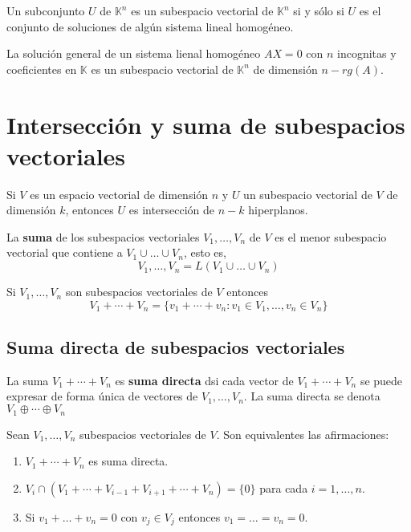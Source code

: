 \begin{theorem}
	Un subconjunto $U$ de $\mathbb{K}^n$ es un subespacio vectorial de $\mathbb{K}^n$ si y sólo si $U$ es el conjunto de soluciones de algún sistema lineal homogéneo.
\end{theorem}

\begin{theorem}
	La solución general de un sistema lienal homogéneo $AX=0$ con $n$ incognitas y coeficientes en $\mathbb{K}$ es un subespacio vectorial de $\mathbb{K}^n$ de dimensión $n-rg(A)$.
\end{theorem}

\section{Intersección y suma de subespacios vectoriales}

\begin{prop}
	Si $V$ es un espacio vectorial de dimensión $n$ y $U$ un subespacio vectorial de $V$ de dimensión $k$, entonces $U$ es intersección de $n-k$ hiperplanos.
\end{prop}

\begin{defi}
	La \textbf{suma} de los subespacios vectoriales $V_1,\ldots,V_n$ de $V$ es el menor subespacio vectorial que contiene a $V_1 \cup \ldots \cup V_n$, esto es,
	\[
	V_1,\ldots,V_n = L(V_1 \cup \ldots \cup V_n)
	\]
\end{defi}

\begin{prop}
	Si $V_1,\ldots,V_n$ son subespacios vectoriales de $V$ entonces
	\[
	V_1 + \cdots + V_n = \lbrace v_1 + \cdots + v_n: v_1 \in V_1,\ldots,v_n \in V_n\rbrace
	\]
\end{prop}

\subsection{Suma directa de subespacios vectoriales}

\begin{defi}
	La suma $V_1 + \cdots + V_n$ es \textbf{suma directa} dsi cada vector de $V_1 + \cdots + V_n$ se puede expresar de forma única de vectores de $V_1,\ldots,V_n$. La suma directa se denota $V_1 \oplus \cdots \oplus V_n$
\end{defi}

\begin{theorem}
	Sean $V_1,\ldots,V_n$ subespacios vectoriales de $V$. Son equivalentes las afirmaciones:
	\begin{enumerate}
		\item $V_1 + \cdots + V_n$ es suma directa.
		\item $V_i \cap (V_1 + \cdots + V_{i-1} + V_{i+1} + \cdots + V_n) = \lbrace 0 \rbrace$ para cada $i=1,\ldots,n$.
		\item Si $v_1+\ldots+v_n=0$ con $v_j \in V_j$ entonces $v_1=\ldots=v_n=0$.
	\end{enumerate}
\end{theorem}

